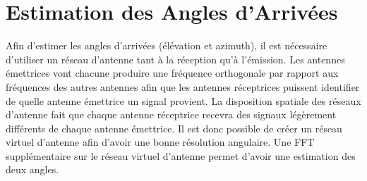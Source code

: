 \section{Estimation des Angles d'Arrivées}

Afin d'estimer les angles d'arrivées (élévation et azimuth), il est nécessaire d'utiliser un réseau d'antenne tant à la réception qu'à l'émission. Les antennes émettrices vont chacune produire une fréquence orthogonale par rapport aux fréquences des autres antennes afin que les antennes réceptrices puissent identifier de quelle antenne émettrice un signal provient. La disposition spatiale des réseaux d'antenne fait que chaque antenne réceptrice recevra des signaux légèrement différents de chaque antenne émettrice. Il est donc possible de créer un réseau virtuel d'antenne afin d'avoir une bonne résolution angulaire. Une FFT supplémentaire sur le réseau virtuel d'antenne permet d'avoir une estimation  des deux angles. 